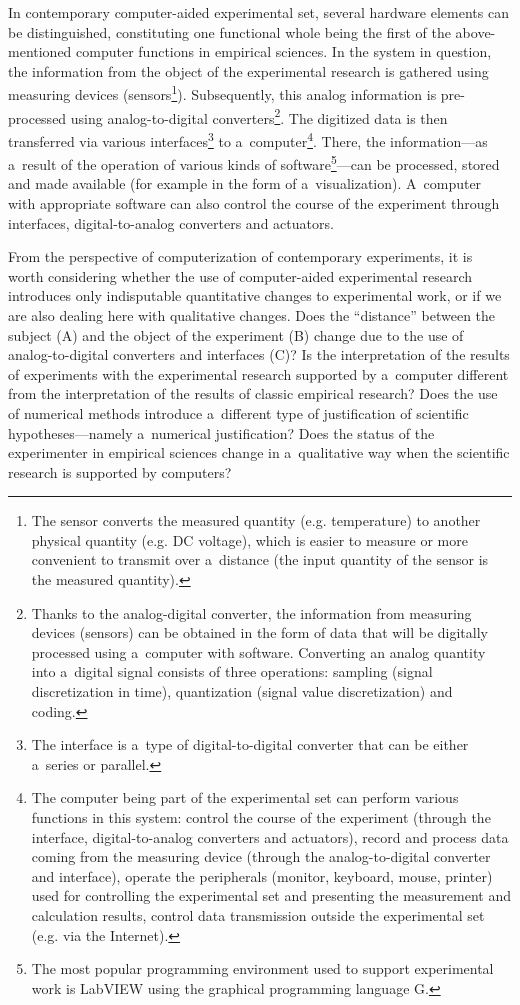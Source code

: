 In contemporary computer-aided experimental set, several hardware elements can be distinguished, constituting one functional whole being the first of the above-mentioned computer functions in empirical sciences. In the system in question, the information from the object of the experimental research is gathered using measuring devices (sensors\footnote{The sensor converts the measured quantity (e.g. temperature) to another physical quantity (e.g. DC voltage), which is easier to measure or more convenient to transmit over a~distance (the input quantity of the sensor is the measured quantity).}). Subsequently, this analog information is pre-processed using analog-to-digital converters\footnote{Thanks to the analog-digital converter, the information from measuring devices (sensors) can be obtained in the form of data that will be digitally processed using a~computer with software. Converting an analog quantity into a~digital signal consists of three operations: sampling (signal discretization in time), quantization (signal value discretization) and coding.}. The digitized data is then transferred via various interfaces\footnote{The interface is a~type of digital-to-digital converter that can be either a~series or parallel.} to a~computer\footnote{The computer being part of the experimental set can perform various functions in this system: control the course of the experiment (through the interface, digital-to-analog converters and actuators), record and process data coming from the measuring device (through the analog-to-digital converter and interface), operate the peripherals (monitor, keyboard, mouse, printer) used for controlling the experimental set and presenting the measurement and calculation results, control data transmission outside the experimental set (e.g. via the Internet). }. There, the information---as a~result of the operation of various kinds of software\footnote{The most popular programming environment used to support experimental work is LabVIEW using the graphical programming language G.}---can be processed, stored and made available (for example in the form of a~visualization). A~computer with appropriate software can also control the course of the experiment through interfaces, digital-to-analog converters and actuators.



From the perspective of computerization of contemporary experiments, it is worth considering whether the use of computer-aided experimental research introduces only indisputable quantitative changes to experimental work, or if we are also dealing here with qualitative changes. Does the ``distance'' between the subject (A) and the object of the experiment (B) change due to the use of analog-to-digital converters and interfaces (C)? Is the interpretation of the results of experiments with the experimental research supported by a~computer different from the interpretation of the results of classic empirical research? Does the use of numerical methods introduce a~different type of justification of scientific hypotheses---namely a~numerical justification? Does the status of the experimenter in empirical sciences change in a~qualitative way when the scientific research is supported by computers?



